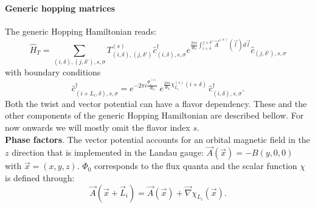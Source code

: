 \paragraph*{Generic hopping matrices}\label{sec:generic_hopping}

The generic Hopping Hamiltonian  reads: 
\begin{equation}
\hat{H}_T = \sum_{(i,\delta), (j,\delta'), s, \sigma}    T_{(i,\delta), (j,\delta')}^{(s)}    \hat{c}^{\dagger}_{(i,\delta),s,\sigma }   e^{\frac{2 \pi i}{\Phi_0} \int_{i + \delta}^{j + \delta'}  \vec{A}^{(s)}(\vec{l})  d \vec{l}} \hat{c}^{}_{(j,\delta'),s,\sigma }
\label{generic_hopping.eq}
\end{equation}
with boundary conditions 
\begin{equation}
\hat{c}^{\dagger}_{(i + L_i,\delta) ,s,\sigma }   =  e^{- 2 \pi i\frac{\Phi_i^{(s)}}{\Phi_0}} \, e^{\frac{2 \pi i }{\Phi_0} \chi^{(s)}_{L_i} ( i + \delta ) } \, \hat{c}^{\dagger}_{(i,\delta) ,s,\sigma }.
\label{generic_boundary.eq}
\end{equation}
Both the twist and  vector  potential can have a flavor dependency. These and the other components of the generic Hopping Hamiltonian are described bellow. For now onwards we will  mostly omit the flavor index ${s}$.\\

\noindent
\textbf{Phase factors}.  
The vector potential accounts for an orbital magnetic field in the $z$ direction that is implemented  in the Landau  gauge:  $\vec{A}(\vec{x})  =  -B(y,0,0) $ with $ \vec{x} = (x,y,z)$. $\Phi_0$ corresponds to the flux quanta and the scalar function $\chi$ is defined through:
\begin{equation}
\vec{A}( \vec{x} + \vec{L}_{i} )  = \vec{A}( \vec{x} )   +  \vec{\nabla} \chi_{L_{i}}(\vec{x}). 
\end{equation}

